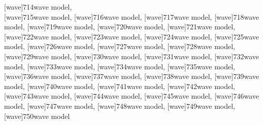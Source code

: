 \documentclass[a4paper,11pt]{article}
\begin{document}
[wave]{714}{wave model}, \\[0.7em]
[wave]{715}{wave model},
[wave]{716}{wave model},
[wave]{717}{wave model},
[wave]{718}{wave model},
[wave]{719}{wave model},
[wave]{720}{wave model},
[wave]{721}{wave model}, \\[0.7em]
[wave]{722}{wave model},
[wave]{723}{wave model},
[wave]{724}{wave model},
[wave]{725}{wave model},
[wave]{726}{wave model},
[wave]{727}{wave model},
[wave]{728}{wave model}, \\[0.7em]
[wave]{729}{wave model},
[wave]{730}{wave model},
[wave]{731}{wave model},
[wave]{732}{wave model},
[wave]{733}{wave model},
[wave]{734}{wave model},
[wave]{735}{wave model}, \\[0.7em]
[wave]{736}{wave model},
[wave]{737}{wave model},
[wave]{738}{wave model},
[wave]{739}{wave model},
[wave]{740}{wave model},
[wave]{741}{wave model},
[wave]{742}{wave model}, \\[0.7em]
[wave]{743}{wave model},
[wave]{744}{wave model},
[wave]{745}{wave model},
[wave]{746}{wave model},
[wave]{747}{wave model},
[wave]{748}{wave model},
[wave]{749}{wave model}, \\[0.7em]
[wave]{750}{wave model}











\end{document}
